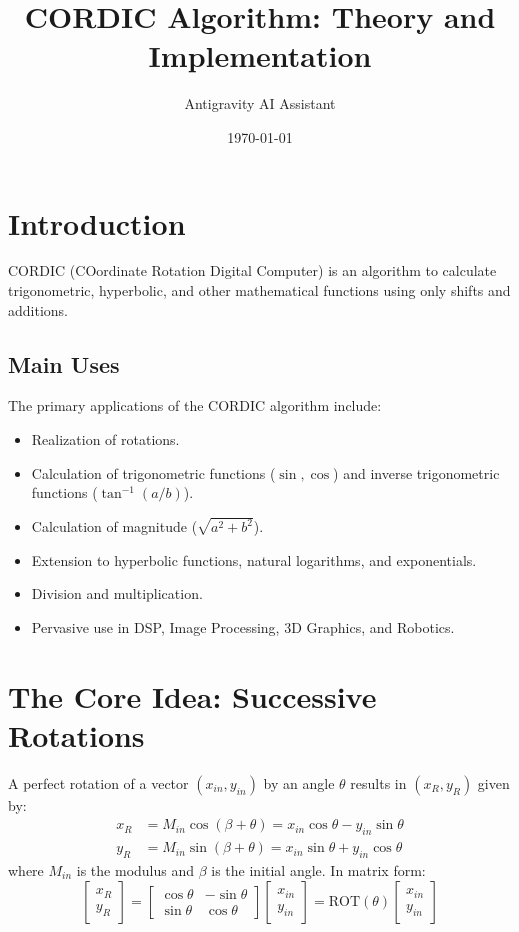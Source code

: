 \documentclass{article}
\title{CORDIC Algorithm: Theory and Implementation}
\author{Antigravity AI Assistant}
\date{\today}
\begin{document}
\maketitle

\section{Introduction}
CORDIC (COordinate Rotation Digital Computer) is an algorithm to calculate trigonometric, hyperbolic, and other mathematical functions using only shifts and additions.

\subsection{Main Uses}
The primary applications of the CORDIC algorithm include:
\begin{itemize}
    \item Realization of rotations.
    \item Calculation of trigonometric functions ($\sin, \cos$) and inverse trigonometric functions ($\tan^{-1}(a/b)$).
    \item Calculation of magnitude ($\sqrt{a^2 + b^2}$).
    \item Extension to hyperbolic functions, natural logarithms, and exponentials.
    \item Division and multiplication.
    \item Pervasive use in DSP, Image Processing, 3D Graphics, and Robotics.
\end{itemize}

\section{The Core Idea: Successive Rotations}
A perfect rotation of a vector $(x_{in}, y_{in})$ by an angle $\theta$ results in $(x_R, y_R)$ given by:
\begin{align}
    x_R &= M_{in} \cos(\beta + \theta) = x_{in} \cos \theta - y_{in} \sin \theta \\
    y_R &= M_{in} \sin(\beta + \theta) = x_{in} \sin \theta + y_{in} \cos \theta
\end{align}
where $M_{in}$ is the modulus and $\beta$ is the initial angle. In matrix form:
\begin{equation}
    \begin{bmatrix} x_R \\ y_R \end{bmatrix} = \begin{bmatrix} \cos \theta & -\sin \theta \\ \sin \theta & \cos \theta \end{bmatrix} \begin{bmatrix} x_{in} \\ y_{in} \end{bmatrix} = \text{ROT}(\theta) \begin{bmatrix} x_{in} \\ y_{in} \end{bmatrix}
\end{equation}
\end{document}
